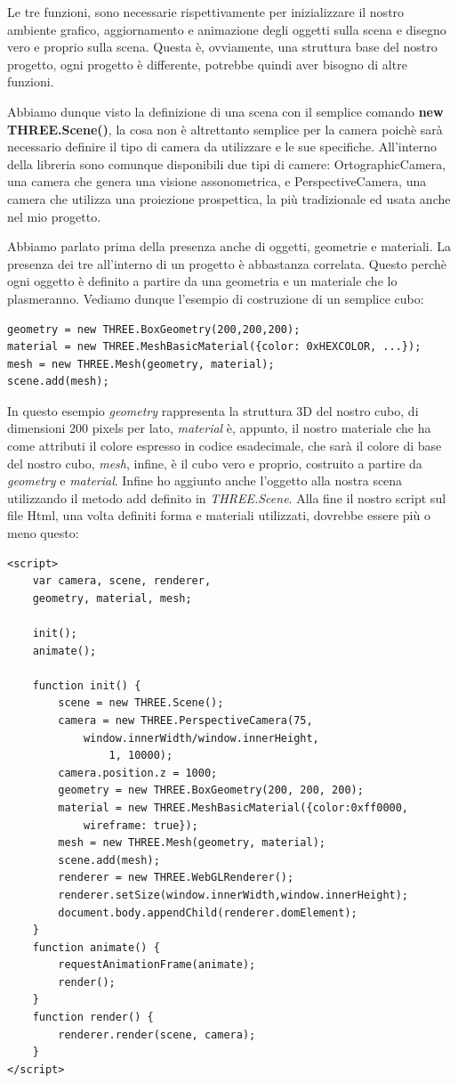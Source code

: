 Le tre funzioni, sono necessarie rispettivamente per inizializzare il nostro ambiente grafico, aggiornamento e animazione degli oggetti sulla scena e disegno vero e proprio sulla scena. Questa è, ovviamente, una struttura base del nostro progetto, ogni progetto è differente, potrebbe quindi aver bisogno di altre funzioni.

Abbiamo dunque visto la definizione di una scena con il semplice comando \textbf{new THREE.Scene()}, la cosa non è altrettanto semplice per la camera poichè sarà necessario definire il tipo di camera da utilizzare e le sue specifiche. All'interno della libreria sono comunque disponibili due tipi di camere: OrtographicCamera, una camera che genera una visione assonometrica, e PerspectiveCamera, una camera che utilizza una proiezione prospettica, la più tradizionale ed usata anche nel mio progetto.

Abbiamo parlato prima della presenza anche di oggetti, geometrie e materiali. La presenza dei tre all'interno di un progetto è abbastanza correlata. Questo perchè ogni oggetto è definito a partire da una geometria e un materiale che lo plasmeranno. Vediamo dunque l'esempio di costruzione di un semplice cubo:
\begin{lstlisting}
geometry = new THREE.BoxGeometry(200,200,200);
material = new THREE.MeshBasicMaterial({color: 0xHEXCOLOR, ...});
mesh = new THREE.Mesh(geometry, material);
scene.add(mesh);
\end{lstlisting}
In questo esempio \textit{geometry} rappresenta la struttura 3D del nostro cubo, di dimensioni 200 pixels per lato, \textit{material} è, appunto, il nostro materiale che ha come attributi il colore espresso in codice esadecimale, che sarà il colore di base del nostro cubo, \textit{mesh}, infine, è il cubo vero e proprio, costruito a partire da \textit{geometry} e \textit{material}. Infine ho aggiunto anche l'oggetto alla nostra scena utilizzando il metodo add definito in \textit{THREE.Scene}. 
Alla fine il nostro script sul file Html, una volta definiti forma e materiali utilizzati, dovrebbe essere più o meno questo:
\begin{lstlisting}
<script>
	var camera, scene, renderer,
    geometry, material, mesh;

    init();
    animate();

    function init() {
        scene = new THREE.Scene();
		camera = new THREE.PerspectiveCamera(75, 
			window.innerWidth/window.innerHeight,
				1, 10000);
        camera.position.z = 1000;
        geometry = new THREE.BoxGeometry(200, 200, 200);
        material = new THREE.MeshBasicMaterial({color:0xff0000, 
        	wireframe: true});
        mesh = new THREE.Mesh(geometry, material);
        scene.add(mesh);
        renderer = new THREE.WebGLRenderer();
        renderer.setSize(window.innerWidth,window.innerHeight);
        document.body.appendChild(renderer.domElement);
    }
	function animate() {
        requestAnimationFrame(animate);
        render();
    }
    function render() {
        renderer.render(scene, camera);
    }
</script>
\end{lstlisting}

